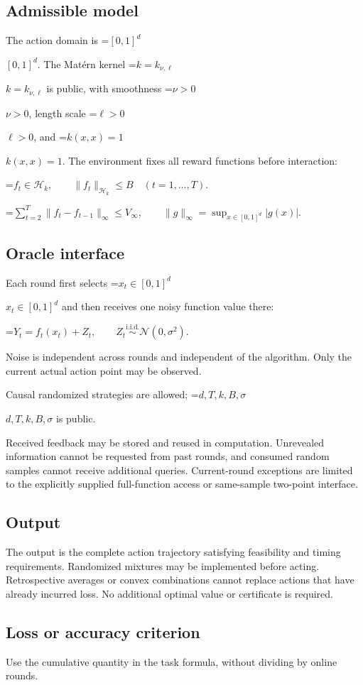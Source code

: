 \documentclass[10pt,a4paper]{article}
\newcommand{\AtlasMath}[1]{\par\begingroup\centering\setbox0=\hbox{$\displaystyle #1$}\ifdim\wd0>1.4\linewidth\typeout{ATLAS WIDE FORMULA: \the\wd0}\fi\ifdim\wd0>\linewidth\resizebox{\linewidth}{!}{\box0}\else\box0\fi\par\endgroup}
\newcommand{\AtlasInlineMath}[1]{\begingroup\setbox0=\hbox{$#1$}\ifdim\wd0>.4\linewidth\endgroup\AtlasMath{#1}\else\endgroup$#1$\fi}
\begin{document}
\subsection{Admissible model}
The action domain is \AtlasInlineMath{[0,1]^d}. The Matérn kernel \AtlasInlineMath{k=k_{\nu,\ell}} is public, with smoothness \AtlasInlineMath{\nu>0}, length scale \AtlasInlineMath{\ell>0}, and \AtlasInlineMath{k(x,x)=1}. The environment fixes all reward functions before interaction:


\AtlasMath{f_t\in\mathcal{H}_k,\qquad \|f_t\|_{\mathcal{H}_k}\le B\quad(t=1,\ldots,T).}



\AtlasMath{\sum_{t=2}^{T}\|f_t-f_{t-1}\|_\infty\le V_\infty,\qquad \|g\|_\infty=\sup_{x\in[0,1]^d}|g(x)|.}


\subsection{Oracle interface}
Each round first selects \AtlasInlineMath{x_t\in[0,1]^d} and then receives one noisy function value there:


\AtlasMath{Y_t=f_t(x_t)+Z_t,\qquad Z_t\overset{\mathrm{i.i.d.}}\sim\mathcal{N}(0,\sigma^2).}


Noise is independent across rounds and independent of the algorithm. Only the current actual action point may be observed.

Causal randomized strategies are allowed; \AtlasInlineMath{d,T,k,B,\sigma} is public.

Received feedback may be stored and reused in computation. Unrevealed information cannot be requested from past rounds, and consumed random samples cannot receive additional queries. Current-round exceptions are limited to the explicitly supplied full-function access or same-sample two-point interface.

\subsection{Output}
The output is the complete action trajectory satisfying feasibility and timing requirements. Randomized mixtures may be implemented before acting. Retrospective averages or convex combinations cannot replace actions that have already incurred loss. No additional optimal value or certificate is required.

\subsection{Loss or accuracy criterion}
Use the cumulative quantity in the task formula, without dividing by online rounds.
\end{document}
